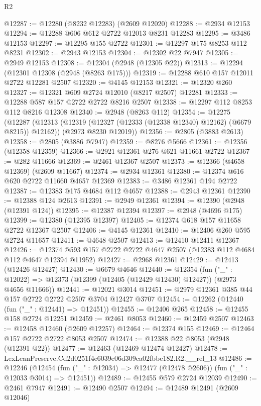 \begin{lexlean}{R2}
\begin{coremodule}
@12287 := @12280 (@8232 @12283) (@2609 @12020)
@12288 := @2934 @12153
@12294 := @12288 @606 @612 @2722 @12013 @8231 @12283
@12295 := @3486 @12153
@12297 := @12295 @155 @2722
@12301 := @12297 @175 @8253 @112 @8231
@12302 := @2943 @12153
@12304 := @12302 @22 @7947
@12305 := @2949 @12153
@12308 := @12304 (@2948 (@12305 @22))
@12313 := @12294 (@12301 @12308 (@2948 (@8263 @175)))
@12319 := @12288 @610 @157 @12011 @2722 @12281 @2507
@12320 := @4145 @12153
@12321 := @12320 @260
@12327 := @12321 @609 @2724 @12010 (@8217 @2507) @12281
@12333 := @12288 @587 @157 @2722 @2722 @8216 @2507
@12338 := @12297 @112 @8253 @112 @8216 @12308
@12340 := @2948 (@8263 @112)
@12354 := @12275
    (@12287
      (@12313 (@12319 (@12327 (@12333 (@12338 @12340) @12162) (@6679 @8215)) @12162))
      (@2973 @8230 @12019))
@12356 := @2805 (@3883 @2613)
@12358 := @2805 (@3886 @7947)
@12359 := @8276 @5666
@12361 := @12356 (@12358 @12359)
@12366 := @2921 @12361 @276 @621 @11661 @2722
@12367 := @282 @11666
@12369 := @2461 @12367 @2507
@12373 := @12366 (@4658 @12369) (@2609 @11667)
@12374 := @2934 @12361
@12380 := @12374 @616 @620 @2722 @11660 @4657 @12369
@12383 := @3486 @12361 @194 @2722
@12387 := @12383 @175 @4684 @112 @4657
@12388 := @2943 @12361
@12390 := @12388 @124 @2613
@12391 := @2949 @12361
@12394 := @12390 (@2948 (@12391 @124))
@12395 := @12387 @12394
@12397 := @2948 (@4696 @175)
@12399 := @12380 (@12395 @12397)
@12405 := @12374 @618 @157 @11658 @2722 @12367 @2507
@12406 := @4145 @12361
@12410 := @12406 @260 @595 @2724 @11657
@12411 := @4648 @2507
@12413 := @12410 @12411 @12367
@12426 := @12374 @593 @157 @2722 @2722 @4647 @2507 (@12383 @112 @4684 @112 @4647 @12394 @11952)
@12427 := @2968 @12361
@12429 := @12413 (@12426 @12427)
@12430 := @6679 @4646
@12440 := @12354
    (fun ("_" : @12022) => @12373 (@12399 (@12405 (@12429 @12430) @12427)) (@2973 @4656 @11666))
@12441 := @12021 @3014
@12451 := @2979 @12361 @385 @44 @157 @2722 @2722 @2507 @3704 @12427 @3707
@12454 := @12262 (@12440 (fun ("_" : @12441) => @12451))
@12455 := @12406 @265
@12458 := @12455 @158 @2724 @12251
@12459 := @2461 @8053
@12460 := @12459 @2507
@12463 := @12458 @12460 (@2609 @12257)
@12464 := @12374 @155
@12469 := @12464 @157 @2722 @2722 @8053 @2507
@12474 := @12388 @22 @8053 (@2948 (@12391 @22))
@12477 := @12463 (@12469 @12474 @12427)
@12478 := LexLeanPreserve.Cd2d0251f4e6039e06d309ca02fbbe182.R2.__rel_13
@12486 := @12246
    (@12454 (fun ("_" : @12034) => @12477 (@12478 @2606)) (fun ("_" : @12033 @3014) => @12451))
@12489 := @12455 @579 @2724 @12039
@12490 := @2461 @7947
@12491 := @12490 @2507
@12494 := @12489 @12491 (@2609 @12046)

\end{coremodule}
\end{lexlean}
